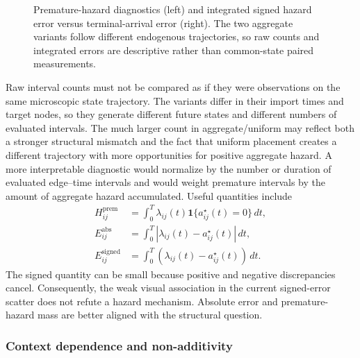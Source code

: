 \begin{figure}[t]
    \centering
    \caption{Premature-hazard diagnostics (left) and integrated signed hazard error versus terminal-arrival error (right).  The two aggregate variants follow different endogenous trajectories, so raw counts and integrated errors are descriptive rather than common-state paired measurements.}
    \label{fig:hazard_placement_hazard_diagnostics}
\end{figure}

Raw interval counts must not be compared as if they were observations on the same microscopic state trajectory.  The variants differ in their import times and target nodes, so they generate different future states and different numbers of evaluated intervals.  The much larger count in aggregate/uniform may reflect both a stronger structural mismatch and the fact that uniform placement creates a different trajectory with more opportunities for positive aggregate hazard.  A more interpretable diagnostic would normalize by the number or duration of evaluated edge--time intervals and would weight premature intervals by the amount of aggregate hazard accumulated.  Useful quantities include
\begin{align}
    H^{\mathrm{prem}}_{ij}
    &=
    \int_0^{T}
    \lambda_{ij}(t)
    \mathbf{1}\{a^{\star}_{ij}(t)=0\}\,dt,
    \label{eq:premature_hazard_mass}
    \\
    E^{\mathrm{abs}}_{ij}
    &=
    \int_0^{T}
    \left|\lambda_{ij}(t)-a^{\star}_{ij}(t)\right|\,dt,
    \label{eq:absolute_hazard_error}
    \\
    E^{\mathrm{signed}}_{ij}
    &=
    \int_0^{T}
    \left(\lambda_{ij}(t)-a^{\star}_{ij}(t)\right)\,dt.
    \label{eq:signed_hazard_error}
\end{align}
The signed quantity can be small because positive and negative discrepancies cancel.  Consequently, the weak visual association in the current signed-error scatter does not refute a hazard mechanism.  Absolute error and premature-hazard mass are better aligned with the structural question.

\subsubsection{Context dependence and non-additivity}
\label{sec:hazard_placement_nonadditivity}


